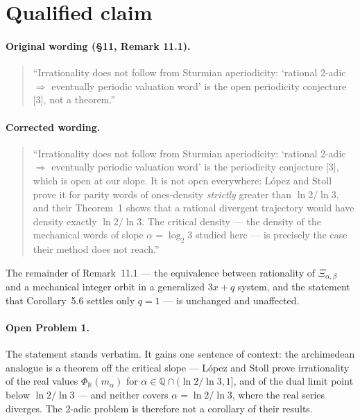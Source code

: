 \documentclass[10pt]{article}
\newcommand{\Xab}{\Xi_{\alpha,\beta}}
\begin{document}
\section{Qualified claim}

\paragraph{Original wording (\S11, Remark 11.1).}
\begin{quote}
``Irrationality does not follow from Sturmian aperiodicity: `rational 2-adic $\Rightarrow$
eventually periodic valuation word' is the open periodicity conjecture [3], not a theorem.''
\end{quote}

\paragraph{Corrected wording.}
\begin{quote}
``Irrationality does not follow from Sturmian aperiodicity: `rational 2-adic $\Rightarrow$
eventually periodic valuation word' is the periodicity conjecture [3], which is open at our slope.
It is not open everywhere: L\'opez and Stoll \cite{lopez2021periodicity} prove it for parity words
of ones-density \emph{strictly} greater than $\ln2/\ln3$, and their Theorem~1 shows that a
rational divergent trajectory would have density exactly $\ln2/\ln3$. The critical density --- the
density of the mechanical words of slope $\alpha=\log_2 3$ studied here --- is precisely the case
their method does not reach.''
\end{quote}

\noindent The remainder of Remark~11.1 --- the equivalence between rationality of $\Xab$ and a
mechanical integer orbit in a generalized $3x+q$ system, and the statement that Corollary~5.6
settles only $q=1$ --- is unchanged and unaffected.

\paragraph{Open Problem 1.} The statement stands verbatim. It gains one sentence of context: the
archimedean analogue is a theorem off the critical slope --- L\'opez and Stoll
\cite{lopez2009conjugacy} prove irrationality of the real values $\Phi_{\mathbb{R}}(m_\alpha)$ for
$\alpha\in\mathbb{Q}\cap(\ln2/\ln3,1]$, and of the dual limit point below $\ln2/\ln3$ --- and
neither covers $\alpha=\ln2/\ln3$, where the real series diverges. The 2-adic problem is therefore
not a corollary of their results.
\end{document}
